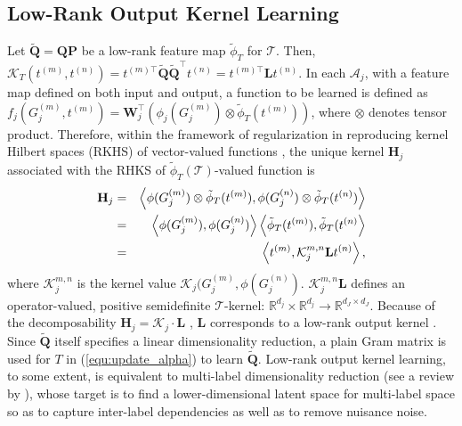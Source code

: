 \documentclass[a4paper]{article}
\begin{document}
\subsection{Low-Rank Output Kernel Learning}
Let $\tilde{\mathbf{Q}}=\mathbf{QP}$ be a low-rank feature map $\tilde{\phi}_T$ for $\mathcal{T}$.
Then, $\mathcal{K}_T (t^{(m)}, t^{(n)})=t^{(m) \top} \tilde{\mathbf{Q}} 
\tilde{\mathbf{Q}}^\top t^{(n)}=t^{(m) \top} \mathbf{L} t^{(n)}$. In each $\mathcal{A}_j$, with a feature map defined on both input and output, a function to be 
learned is defined as $f_j(G_j^{(m)},t^{(m)})=\mathbf{W}_j^\top \left(\phi_j(G_j^{(m)})\otimes \tilde{\phi}_T(t^{(m)})\right)$, where $\otimes$ denotes tensor product. Therefore, within the framework 
of regularization in reproducing kernel Hilbert 
spaces (RKHS) of vector-valued functions \cite{vector_value_function},  the unique 
kernel $\mathbf{H}_j$ associated with the RHKS of $\tilde{\phi}_T(\mathcal{T})$-valued function is
\begin{eqnarray*}
    \small
        \mathbf{H}_j &=& \left\langle \phi(G_j^{(m)})\otimes \tilde{\phi}_T(t^{(m)}), \phi(G_j^{(n)})\otimes \tilde{\phi}_T(t^{(n)}) \right\rangle  \\
        &=& \left\langle \phi(G_j^{(m)}),\phi(G_j^{(n)}) \right\rangle \left\langle \tilde{\phi}_T(t^{(m)}),\tilde{\phi}_T(t^{(n)}\right\rangle \\ 
        &=& \left\langle t^{(m)}, \mathcal{K}_j^{m,n} \mathbf{L} t^{(n)} \right\rangle,
\end{eqnarray*}
where $\mathcal{K}_j^{m,n}$ is the kernel value $\mathcal{K}_j(G_j^{(m)},\phi(G_j^{(n)})$. $\mathcal{K}_j^{m,n} \mathbf{L}$ defines an operator-valued, 
positive semidefinite $\mathcal{T}$-kernel: $\mathbb{R}^{d_j}\times \mathbb{R}^{d_j}\to \mathbb{R}^{d_J \times d_J}$. 
Because of the decomposability $\mathbf{H}_j=\mathcal{K}_j\cdot \mathbf{L}$ \cite{output_kernel}, $\mathbf{L}$ corresponds to a low-rank output kernel \cite{low_rank_kernel}. 
Since $\tilde{\mathbf{Q}}$ itself specifies a linear dimensionality reduction, a
plain Gram matrix is used for $T$ in (\ref{equ:update_alpha}) to learn $\tilde{\mathbf{Q}}$.      
Low-rank output kernel learning, to some extent, is equivalent to multi-label dimensionality reduction (see a review by \citeauthor{sun_MLDR}\citeyear{sun_MLDR}),              
whose target is to find a lower-dimensional latent space for multi-label space so as to capture inter-label dependencies as well as to remove nuisance noise.             
\end{document}
